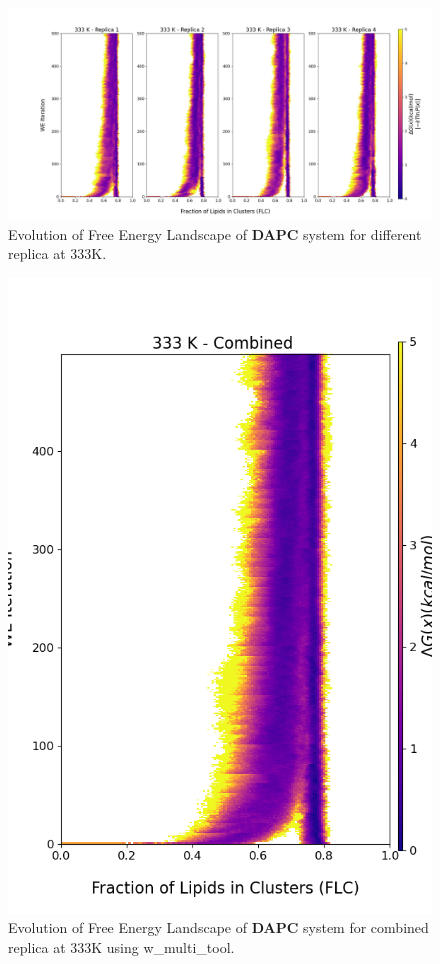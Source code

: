 \documentclass{biophys-new}
\begin{document}
\begin{figure}[hbt!]
\centering
\includegraphics[width=1.1\linewidth]{all_plots/ClusterLipids2Total/DPPC_DAPC_CHOL/333K/Evolution_DAPC_333_ClusterLipids2Total.png}
\caption{Evolution of Free Energy Landscape of \textbf{DAPC} system for different replica at 333K.}
\label{fig:view}

\end{figure}

\begin{figure}[hbt!]
\centering
\includegraphics[width=0.8\linewidth]{all_plots/ClusterLipids2Total/DPPC_DAPC_CHOL/333K/Evolution_DAPC_MULTI__333_ClusterLipids2Total.png}
\caption{Evolution of Free Energy Landscape of \textbf{DAPC} system for combined replica at 333K using w\_multi\_tool.}
\label{fig:view}

\end{figure}
\end{document}
